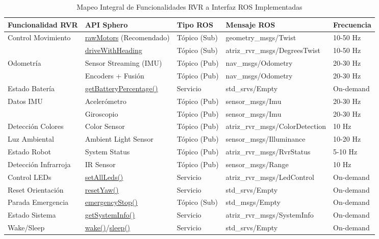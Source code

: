 \documentclass[11pt]{article}
\newcommand{\code}[1]{\textcolor{codeblue}{\url{#1}}}
\newcommand{\funcion}[1]{\textcolor{darkblue}{\url{#1}}}
\numberwithin{figure}{section}
\numberwithin{table}{section}
\def\code#1{#1}%
\begin{document}
\begin{table}[htbp]
\centering
\caption{Mapeo Integral de Funcionalidades RVR a Interfaz ROS Implementadas}
\label{tab:mapeo_rvr_ros}
\begin{tabular}{|p{}|p{}|p{}|p{}|p{}|}
\hline
\textbf{Funcionalidad RVR} & \textbf{API Sphero} & \textbf{Tipo ROS} & \textbf{Mensaje ROS} & \textbf{Frecuencia} \\
\hline
\multirow{2}{*}{Control Movimiento} & \funcion{rawMotors} (Recomendado) & Tópico (Sub) & \code{geometry\_msgs/Twist} & 10-50 Hz \\
\cline{2-5}
& \funcion{driveWithHeading} & Tópico (Sub) & \code{atriz\_rvr\_msgs/DegreesTwist} & 10-50 Hz \\
\hline
\multirow{2}{*}{Odometría} & Sensor Streaming (IMU) & Tópico (Pub) & \code{nav\_msgs/Odometry} & 20-30 Hz \\
\cline{2-5}
& Encoders + Fusión & Tópico (Pub) & \code{nav\_msgs/Odometry} & 20-30 Hz \\
\hline
Estado Batería & \funcion{getBatteryPercentage()} & Servicio & \code{std\_srvs/Empty} & On-demand \\
\hline
\multirow{2}{*}{Datos IMU} & Acelerómetro & Tópico (Pub) & \code{sensor\_msgs/Imu} & 20-30 Hz \\
\cline{2-5}
& Giroscopio & Tópico (Pub) & \code{sensor\_msgs/Imu} & 20-30 Hz \\
\hline
Detección Colores & Color Sensor & Tópico (Pub) & \code{atriz\_rvr\_msgs/ColorDetection} & 10 Hz \\
\hline
Luz Ambiental & Ambient Light Sensor & Tópico (Pub) & \code{sensor\_msgs/Illuminance} & 10-20 Hz \\
\hline
Estado Robot & System Status & Tópico (Pub) & \code{atriz\_rvr\_msgs/RvrStatus} & 5-10 Hz \\
\hline
Detección Infrarroja & IR Sensor & Tópico (Pub) & \code{sensor\_msgs/Range} & 10 Hz \\
\hline
Control LEDs & \funcion{setAllLeds()} & Servicio & \code{atriz\_rvr\_msgs/LedControl} & On-demand \\
\hline
Reset Orientación & \funcion{resetYaw()} & Servicio & \code{std\_srvs/Empty} & On-demand \\
\hline
Parada Emergencia & \funcion{emergencyStop()} & Tópico (Sub) & \code{std\_msgs/Empty} & On-demand \\
\hline
Estado Sistema & \funcion{getSystemInfo()} & Servicio & \code{atriz\_rvr\_msgs/SystemInfo} & On-demand \\
\hline
Wake/Sleep & \funcion{wake()}/\funcion{sleep()} & Servicio & \code{std\_srvs/Empty} & On-demand \\
\hline
\end{tabular}
\end{table}
\end{document}
